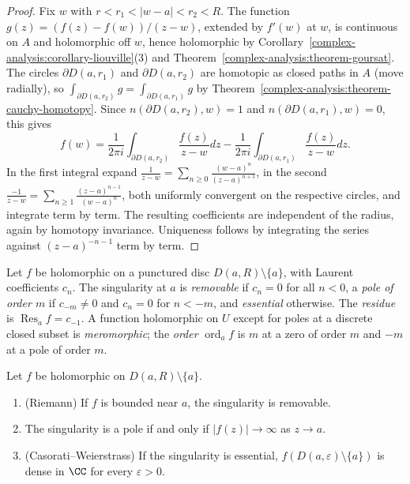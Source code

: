 \begin{proof}
Fix $w$ with $r < r_1 < |w - a| < r_2 < R$. The function $g(z) = (f(z) - f(w))/(z - w)$, extended by $f'(w)$ at $w$, is continuous on $A$ and holomorphic off $w$, hence holomorphic by
Corollary~\ref{complex-analysis:corollary-liouville}(3) and Theorem~\ref{complex-analysis:theorem-goursat}. The circles $\partial D(a, r_1)$ and $\partial D(a, r_2)$ are homotopic as closed paths in $A$ (move
radially), so $\int_{\partial D(a, r_2)}g = \int_{\partial D(a, r_1)}g$ by Theorem~\ref{complex-analysis:theorem-cauchy-homotopy}. Since $n(\partial D(a, r_2), w) = 1$ and $n(\partial D(a, r_1), w) = 0$, this
gives
\[
f(w) = \frac{1}{2\pi i}\int_{\partial D(a, r_2)}\frac{f(z)}{z - w}dz - \frac{1}{2\pi i}\int_{\partial D(a, r_1)}\frac{f(z)}{z - w}dz.
\]
In the first integral expand $\frac{1}{z - w} = \sum_{n \geq 0}\frac{(w - a)^n}{(z - a)^{n+1}}$, in the second $\frac{-1}{z - w} = \sum_{n \geq 1}\frac{(z - a)^{n-1}}{(w - a)^n}$, both uniformly convergent on the
respective circles, and integrate term by term. The resulting coefficients are independent of the radius, again by homotopy invariance. Uniqueness follows by integrating the series against
$(z - a)^{-n-1}$ term by term.
\end{proof}

\begin{definition}\label{complex-analysis:definition-singularity}
Let $f$ be holomorphic on a punctured disc $D(a, R) \setminus \{a\}$, with Laurent coefficients $c_n$. The singularity at $a$ is \emph{removable} if $c_n = 0$ for all $n < 0$, a \emph{pole of order $m$} if
$c_{-m} \neq 0$ and $c_n = 0$ for $n < -m$, and \emph{essential} otherwise. The \emph{residue} is $\operatorname{Res}_af = c_{-1}$. A function holomorphic on $U$ except for poles at a discrete closed subset
is \emph{meromorphic}; the \emph{order} $\operatorname{ord}_af$ is $m$ at a zero of order $m$ and $-m$ at a pole of order $m$.
\end{definition}

\begin{proposition}\label{complex-analysis:proposition-singularities}
Let $f$ be holomorphic on $D(a, R) \setminus \{a\}$.
\begin{enumerate}
\item (Riemann) If $f$ is bounded near $a$, the singularity is removable.
\item The singularity is a pole if and only if $|f(z)| \to \infty$ as $z \to a$.
\item (Casorati--Weierstrass) If the singularity is essential, $f(D(a, \varepsilon) \setminus \{a\})$ is dense in $\CC$ for every $\varepsilon > 0$.
\end{enumerate}
\end{proposition}

